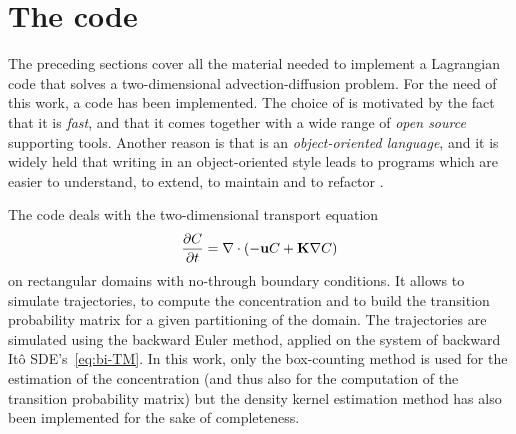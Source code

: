 \section{The code} \label{sec:thecode}
The preceding sections cover all the material needed to implement a Lagrangian code that solves a two-dimensional advection-diffusion problem. For the need of this work, a \Cpp code has been implemented. The choice of \Cpp is motivated by the fact that it is \textit{fast}, and that it comes together with a wide range of \textit{open source} supporting tools. Another reason is that \Cpp is an \textit{object-oriented language}, and it is widely held that writing in an object-oriented style leads to programs which are easier to understand, to extend, to maintain and to refactor \cite{pitt2012guide}.

The code deals with the two-dimensional transport equation
\begin{equation} \label{eq:TEcode}
	\frac{\partial C}{\partial t} = \nabla \cdot (-\mathbf u C + \mathbf K \nabla C)
\end{equation}
on rectangular domains with no-through boundary conditions. It allows to simulate trajectories, to compute the concentration and to build the transition probability matrix for a given partitioning of the domain. The trajectories are simulated using the backward Euler method, applied on the system of backward Itô SDE's~\eqref{eq:bi-TM}.
In this work, only the box-counting method is used for the estimation of the concentration (and thus also for the computation of the transition probability matrix) but the density kernel estimation method has also been implemented for the sake of completeness.

